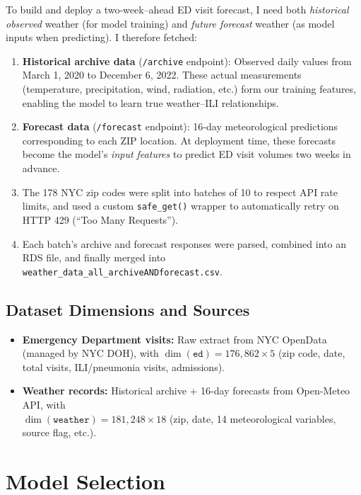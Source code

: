 \documentclass[11pt]{article}
\begin{document}
To build and deploy a two‐week–ahead ED visit forecast, I need both \emph{historical observed} weather (for model training) and \emph{future forecast} weather (as model inputs when predicting).  I therefore fetched:

\begin{enumerate}[nosep]
  \item \textbf{Historical archive data} (\texttt{/archive} endpoint):  
    Observed daily values from March 1, 2020 to December 6, 2022.  
    These actual measurements (temperature, precipitation, wind, radiation, etc.) form our training features, enabling the model to learn true weather–ILI relationships.
  \item \textbf{Forecast data} (\texttt{/forecast} endpoint):  
    16‐day meteorological predictions corresponding to each ZIP location.  
    At deployment time, these forecasts become the model’s \emph{input features} to predict ED visit volumes two weeks in advance.
  \item The 178 NYC zip codes were split into batches of 10 to respect API rate limits, and used a custom \texttt{safe\_get()} wrapper to automatically retry on HTTP 429 (“Too Many Requests”).
  \item Each batch’s archive and forecast responses were parsed, combined into an RDS file, and finally merged into \texttt{weather\_data\_all\_archiveANDforecast.csv}.
\end{enumerate}

\subsection{Dataset Dimensions and Sources}

\begin{itemize}[nosep]
  \item \textbf{Emergency Department visits:}  
    Raw extract from NYC OpenData (managed by NYC DOH), with
    \(\dim(\texttt{ed}) = 176{,}862\times5\)  
    (zip code, date, total visits, ILI/pneumonia visits, admissions).
  \item \textbf{Weather records:}  
    Historical archive + 16-day forecasts from Open-Meteo API, with\\
    \(\dim(\texttt{weather}) = 181{,}248\times18\)  
    (zip, date, 14 meteorological variables, source flag, etc.).
\end{itemize}

\section{Model Selection}
\end{document}
